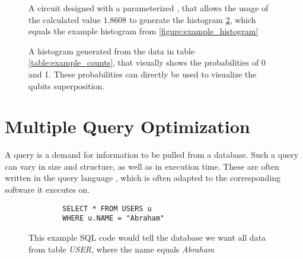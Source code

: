 \begin{figure}[!h]
    \centering
    \caption{A circuit designed with a parameterized \rygate, that allows the usage of the calculated value $1.8608$ to generate the histogram \ref{figure:circuit_histogram}, which equals the example histogram from \ref{figure:example_histogram}}
    \label{figure:circuit_for_histogram}
\end{figure}


\begin{figure}[!h]
    \centering
    \scalebox{\histogramwidth}{
        
    }
    \caption{A histogram generated from the data in table \ref{table:example_counts}, that visually shows the probabilities of 0 and 1. These probabilities can directly be used to visualize the qubits superposition.}
    \label{figure:circuit_histogram}
\end{figure}


\newpage

\section{Multiple Query Optimization}

A query\cite{codd_relational_1970} is a demand for information to be pulled from a database. Such a query can vary in size and structure, as well as in execution time. These are often written in the query language , which is often adapted to the corresponding software\cite{shirgoldbird_microsoft_nodate}\cite{the_postgresql_global_development_group_postgresql_2022} it executes on. 

    
\begin{figure}[!h]
    \centering
    \begin{verbatim}
        SELECT * FROM USERS u
        WHERE u.NAME = "Abraham"
    \end{verbatim}
    \caption{This example SQL code would tell the database we want all data from table \emph{USER}, where the name equals \emph{Abraham}}
    \label{figure:sql_query_example}
\end{figure}

